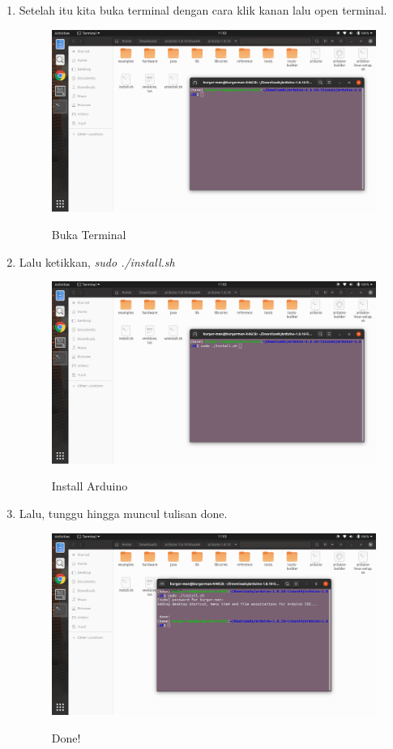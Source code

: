 \begin{enumerate}
\item Setelah itu kita buka terminal dengan cara klik kanan lalu open terminal.
\begin{figure}[H]
\centering
\caption{Buka Terminal}
\includegraphics[width=1\textwidth]{figures/4.png}
\label{bukaterminal}
\end{figure}

\item Lalu ketikkan, \textit{sudo ./install.sh}
\begin{figure}[H]
\centering
\caption{Install Arduino}
\includegraphics[width=1\textwidth]{figures/5.png}
\label{installarduino}
\end{figure}

\item Lalu, tunggu hingga muncul tulisan done.
\begin{figure}[H]
\centering
\caption{Done!}
\includegraphics[width=1\textwidth]{figures/6.png}
\label{tungguselesai}
\end{figure}


\end{enumerate}
